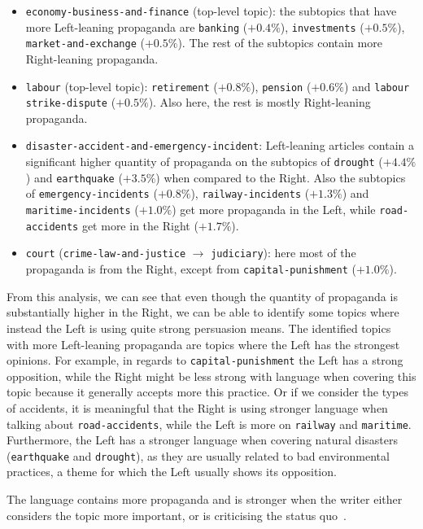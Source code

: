 \begin{itemize}
    \item \texttt{economy-business-and-finance} (top-level topic): the subtopics that have more Left-leaning propaganda  are \texttt{banking} ($+0.4\%$), \texttt{investments} ($+0.5\%$), \texttt{market-and-exchange} ($+0.5\%$). The rest of the subtopics contain more Right-leaning propaganda.
    \item \texttt{labour} (top-level topic): \texttt{retirement} ($+0.8\%$), \texttt{pension} ($+0.6\%$) and \texttt{labour} \texttt{strike-dispute} ($+0.5\%$). Also here, the rest is mostly Right-leaning propaganda.
    \item \texttt{disaster-accident-and-emergency-incident}: Left-leaning articles contain a significant higher quantity of propaganda on the subtopics of \texttt{drought} ($+4.4\%$) and \texttt{earthquake} ($+3.5\%$) when compared to the Right. Also the subtopics of \texttt{emergency-incidents} ($+0.8\%$), \texttt{railway-incidents} ($+1.3\%$) and \texttt{maritime-incidents} ($+1.0\%$) get more propaganda in the Left, while \texttt{road-accidents} get more in the Right ($+1.7\%$).
    \item \texttt{court} (\texttt{crime-law-and-justice} $\rightarrow$ \texttt{judiciary}): here most of the propaganda is from the Right, except from \texttt{capital-punishment} ($+1.0\%$).
\end{itemize}

From this analysis, we can see that even though the quantity of propaganda is substantially higher in the Right, we can be able to identify some topics where instead the Left is using quite strong persuasion means.
The identified topics with more Left-leaning propaganda are topics where the Left has the strongest opinions. For example, in regards to \texttt{capital-punishment} the Left has a strong opposition, while the Right might be less strong with language when covering this topic because it generally accepts more this practice.
Or if we consider the types of accidents, it is meaningful that the Right is using stronger language when talking about \texttt{road-accidents}, while the Left is more on \texttt{railway} and \texttt{maritime}. Furthermore, the Left has a stronger language when covering natural disasters (\texttt{earthquake} and \texttt{drought}), as they are usually related to bad environmental practices, a theme for which the Left usually shows its opposition.

The language contains more propaganda and is stronger when the writer either considers the topic more important, or is criticising the status quo~\citep{rose1992political}.


